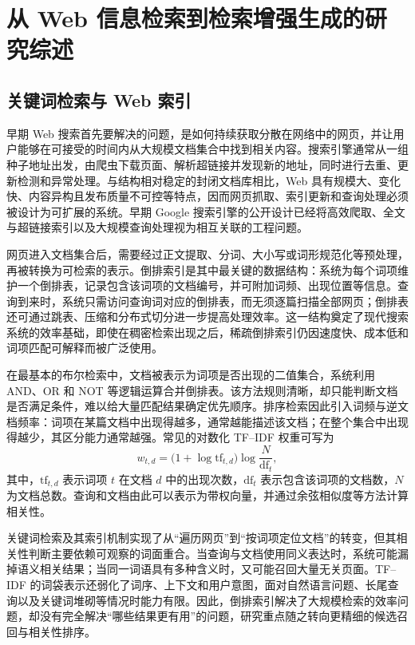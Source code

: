 \section{从 Web 信息检索到检索增强生成的研究综述}

\subsection{关键词检索与 Web 索引}

早期 Web 搜索首先要解决的问题，是如何持续获取分散在网络中的网页，并让用户能够在可接受的时间内从大规模文档集合中找到相关内容。搜索引擎通常从一组种子地址出发，由爬虫下载页面、解析超链接并发现新的地址，同时进行去重、更新检测和异常处理。与结构相对稳定的封闭文档库相比，Web 具有规模大、变化快、内容异构且发布质量不可控等特点，因而网页抓取、索引更新和查询处理必须被设计为可扩展的系统。早期 Google 搜索引擎的公开设计已经将高效爬取、全文与超链接索引以及大规模查询处理视为相互关联的工程问题\parencite{brin1998anatomy}。

网页进入文档集合后，需要经过正文提取、分词、大小写或词形规范化等预处理，再被转换为可检索的表示。倒排索引是其中最关键的数据结构：系统为每个词项维护一个倒排表，记录包含该词项的文档编号，并可附加词频、出现位置等信息。查询到来时，系统只需访问查询词对应的倒排表，而无须逐篇扫描全部网页；倒排表还可通过跳表、压缩和分布式切分进一步提高处理效率\parencite{manning2008ir}。这一结构奠定了现代搜索系统的效率基础，即使在稠密检索出现之后，稀疏倒排索引仍因速度快、成本低和词项匹配可解释而被广泛使用。

在最基本的布尔检索中，文档被表示为词项是否出现的二值集合，系统利用 AND、OR 和 NOT 等逻辑运算合并倒排表。该方法规则清晰，却只能判断文档是否满足条件，难以给大量匹配结果确定优先顺序。排序检索因此引入词频与逆文档频率：词项在某篇文档中出现得越多，通常越能描述该文档；在整个集合中出现得越少，其区分能力通常越强。常见的对数化 TF--IDF 权重可写为
\begin{equation}
  w_{t,d}=\bigl(1+\log \mathrm{tf}_{t,d}\bigr)
  \log\frac{N}{\mathrm{df}_{t}},
  \label{eq:tfidf}
\end{equation}
其中，$\mathrm{tf}_{t,d}$ 表示词项 $t$ 在文档 $d$ 中的出现次数，$\mathrm{df}_{t}$ 表示包含该词项的文档数，$N$ 为文档总数。查询和文档由此可以表示为带权向量，并通过余弦相似度等方法计算相关性\parencite{manning2008ir}。

关键词检索及其索引机制实现了从“遍历网页”到“按词项定位文档”的转变，但其相关性判断主要依赖可观察的词面重合。当查询与文档使用同义表达时，系统可能漏掉语义相关结果；当同一词语具有多种含义时，又可能召回大量无关页面。TF--IDF 的词袋表示还弱化了词序、上下文和用户意图，面对自然语言问题、长尾查询以及关键词堆砌等情况时能力有限。因此，倒排索引解决了大规模检索的效率问题，却没有完全解决“哪些结果更有用”的问题，研究重点随之转向更精细的候选召回与相关性排序。

